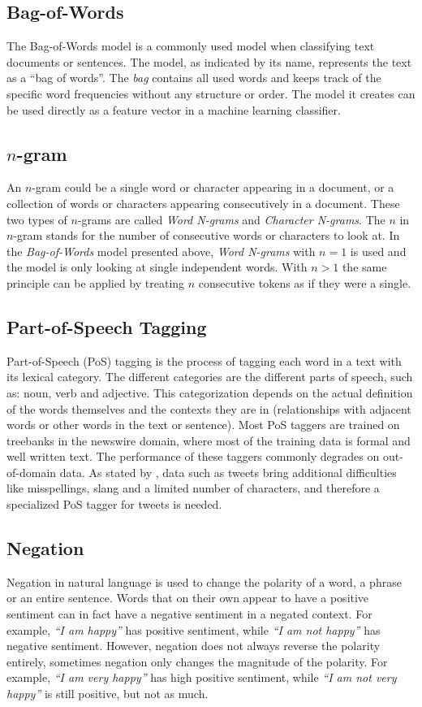 \subsection*{Bag-of-Words}
The Bag-of-Words model is a commonly used model when classifying text documents or sentences. The model, as indicated by its name, represents the text as a ``bag of words''. The \textit{bag} contains all used words and keeps track of the specific word frequencies without any structure or order. The model it creates can be used directly as a feature vector in a machine learning classifier.


\subsection*{$n$-gram}
An $n$-gram could be a single word or character appearing in a document, or a collection of words or characters appearing consecutively in a document. These two types of $n$-grams are called \textit{Word N-grams} and \textit{Character N-grams}. The $n$ in $n$-gram stands for the number of consecutive words or characters to look at.  In the \textit{Bag-of-Words} model presented above, \textit{Word N-grams} with $n = 1$ is used and the model is only looking at single independent words. With $n>1$ the same principle can be applied by treating $n$ consecutive tokens as if they were a single. 


\subsection*{Part-of-Speech Tagging}
Part-of-Speech (PoS) tagging is the process of tagging each word in a text with its lexical category. The different categories are the different parts of speech, such as: noun, verb and adjective. This categorization depends on the actual definition of the words themselves and the contexts they are in (relationships with adjacent words or other words in the text or sentence). Most PoS taggers are trained on treebanks in the newswire domain, where most of the training data is formal and well written text. The performance of these taggers commonly degrades on out-of-domain data. As stated by \cite{Gimpel11}, data such as tweets bring additional difficulties like misspellings, slang and a limited number of characters, and therefore a specialized PoS tagger for tweets is needed. 

\subsection*{Negation}
Negation in natural language is used to change the polarity of a word, a phrase or an entire sentence. Words that on their own appear to have a positive sentiment can in fact have a negative sentiment in a negated context. For example, \textit{``I am happy''} has positive sentiment, while \textit{``I am not happy''} has negative sentiment. However, negation does not always reverse the polarity entirely, sometimes negation only changes the magnitude of the polarity. For example, \textit{``I am very happy''} has high positive sentiment, while \textit{``I am not very happy''} is still positive, but not as much. \\

